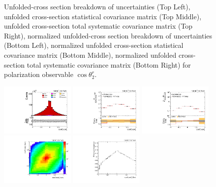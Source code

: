 \begin{figure}[htb]
\begin{center}
\caption{Unfolded-cross section breakdown of uncertainties (Top Left), unfolded cross-section statistical covariance matrix (Top Middle), unfolded cross-section total systematic covariance matrix (Top Right), normalized unfolded-cross section breakdown of uncertainties (Bottom Left), normalized unfolded cross-section statistical covariance matrix (Bottom Middle), normalized unfolded cross-section total systematic covariance matrix (Bottom Right) for polarization observable $\cos\theta_{2}^{r}$.}
\label{fig:b2r_uncertainties}
\end{center}
\end{figure}
\clearpage
\begin{figure}[htb]
\begin{center}
 \includegraphics[width=0.32\textwidth]{fig_fullRun2UL/controlplots/combined/Hyp_LLBarCkk.pdf}
 \includegraphics[width=0.32\textwidth]{fig_fullRun2UL/unfolding/combined/UnfoldedResults_c_kk.pdf}
 \includegraphics[width=0.32\textwidth]{fig_fullRun2UL/unfolding/combined/UnfoldedResultsNorm_c_kk.pdf} \\
 \includegraphics[width=0.32\textwidth]{fig_fullRun2UL/unfolding/combined/ResponseMatrix_c_kk.pdf}
 \includegraphics[width=0.32\textwidth]{fig_fullRun2UL/unfolding/combined/TotEff_c_kk.pdf}

\end{center}
\end{figure}
